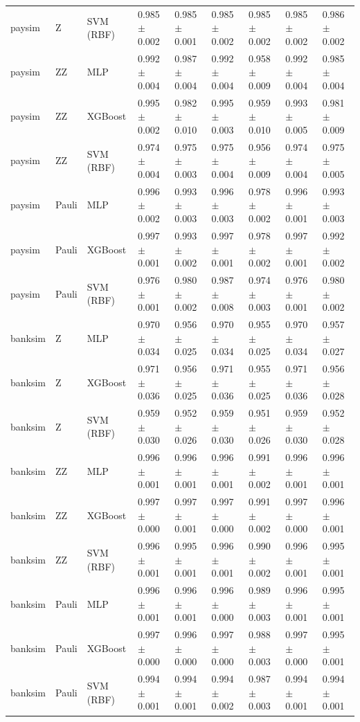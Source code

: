 \begin{table}[t]
{\begin{tabular}{lllllllll}
paysim & Z & SVM (RBF) & 0.985 $\pm$ 0.002 & 0.985 $\pm$ 0.001 & 0.985 $\pm$ 0.002 & 0.985 $\pm$ 0.002 & 0.985 $\pm$ 0.002 & 0.986 $\pm$ 0.002 \\
paysim & ZZ & MLP & 0.992 $\pm$ 0.004 & 0.987 $\pm$ 0.004 & 0.992 $\pm$ 0.004 & 0.958 $\pm$ 0.009 & 0.992 $\pm$ 0.004 & 0.985 $\pm$ 0.004 \\
paysim & ZZ & XGBoost & 0.995 $\pm$ 0.002 & 0.982 $\pm$ 0.010 & 0.995 $\pm$ 0.003 & 0.959 $\pm$ 0.010 & 0.993 $\pm$ 0.005 & 0.981 $\pm$ 0.009 \\
paysim & ZZ & SVM (RBF) & 0.974 $\pm$ 0.004 & 0.975 $\pm$ 0.003 & 0.975 $\pm$ 0.004 & 0.956 $\pm$ 0.009 & 0.974 $\pm$ 0.004 & 0.975 $\pm$ 0.005 \\
paysim & Pauli & MLP & 0.996 $\pm$ 0.002 & 0.993 $\pm$ 0.003 & 0.996 $\pm$ 0.003 & 0.978 $\pm$ 0.002 & 0.996 $\pm$ 0.001 & 0.993 $\pm$ 0.003 \\
paysim & Pauli & XGBoost & 0.997 $\pm$ 0.001 & 0.993 $\pm$ 0.002 & 0.997 $\pm$ 0.001 & 0.978 $\pm$ 0.002 & 0.997 $\pm$ 0.001 & 0.992 $\pm$ 0.002 \\
paysim & Pauli & SVM (RBF) & 0.976 $\pm$ 0.001 & 0.980 $\pm$ 0.002 & 0.987 $\pm$ 0.008 & 0.974 $\pm$ 0.003 & 0.976 $\pm$ 0.001 & 0.980 $\pm$ 0.002 \\
banksim & Z & MLP & 0.970 $\pm$ 0.034 & 0.956 $\pm$ 0.025 & 0.970 $\pm$ 0.034 & 0.955 $\pm$ 0.025 & 0.970 $\pm$ 0.034 & 0.957 $\pm$ 0.027 \\
banksim & Z & XGBoost & 0.971 $\pm$ 0.036 & 0.956 $\pm$ 0.025 & 0.971 $\pm$ 0.036 & 0.955 $\pm$ 0.025 & 0.971 $\pm$ 0.036 & 0.956 $\pm$ 0.028 \\
banksim & Z & SVM (RBF) & 0.959 $\pm$ 0.030 & 0.952 $\pm$ 0.026 & 0.959 $\pm$ 0.030 & 0.951 $\pm$ 0.026 & 0.959 $\pm$ 0.030 & 0.952 $\pm$ 0.028 \\
banksim & ZZ & MLP & 0.996 $\pm$ 0.001 & 0.996 $\pm$ 0.001 & 0.996 $\pm$ 0.001 & 0.991 $\pm$ 0.002 & 0.996 $\pm$ 0.001 & 0.996 $\pm$ 0.001 \\
banksim & ZZ & XGBoost & 0.997 $\pm$ 0.000 & 0.997 $\pm$ 0.001 & 0.997 $\pm$ 0.000 & 0.991 $\pm$ 0.002 & 0.997 $\pm$ 0.000 & 0.996 $\pm$ 0.001 \\
banksim & ZZ & SVM (RBF) & 0.996 $\pm$ 0.001 & 0.995 $\pm$ 0.001 & 0.996 $\pm$ 0.001 & 0.990 $\pm$ 0.002 & 0.996 $\pm$ 0.001 & 0.995 $\pm$ 0.001 \\
banksim & Pauli & MLP & 0.996 $\pm$ 0.001 & 0.996 $\pm$ 0.001 & 0.996 $\pm$ 0.000 & 0.989 $\pm$ 0.003 & 0.996 $\pm$ 0.001 & 0.995 $\pm$ 0.001 \\
banksim & Pauli & XGBoost & 0.997 $\pm$ 0.000 & 0.996 $\pm$ 0.000 & 0.997 $\pm$ 0.000 & 0.988 $\pm$ 0.003 & 0.997 $\pm$ 0.000 & 0.995 $\pm$ 0.001 \\
banksim & Pauli & SVM (RBF) & 0.994 $\pm$ 0.001 & 0.994 $\pm$ 0.001 & 0.994 $\pm$ 0.002 & 0.987 $\pm$ 0.003 & 0.994 $\pm$ 0.001 & 0.994 $\pm$ 0.001 \\
\hline
\end{tabular}}
\end{table}
